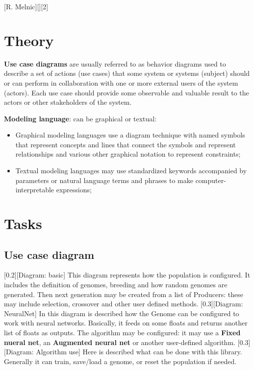 \documentclass{article}
\begin{document}
	[R. Melnic][][2]

	\section{Theory}
		\par \textbf{Use case diagrams} are usually referred to as behavior diagrams used to describe a set of actions (use cases) that some system or systems (subject) should or can perform in collaboration with one or more external users of the system (actors). Each use case should provide some observable and valuable result to the actors or other stakeholders of the system.

		\bigskip
		\textbf{Modeling language}: can be graphical or textual:
		\begin{itemize}
			\item Graphical modeling languages use a diagram technique with named symbols that represent concepts and lines that connect the symbols and represent relationships and various other graphical notation to represent constraints;
			\item Textual modeling languages may use standardized keywords accompanied by parameters or natural language terms and phrases to make computer-interpretable expressions;
		\end{itemize}

	\newpage
	\section{Tasks}
		\subsection{Use case diagram}
			[0.2][Diagram: basic]
			This diagram represents how the population is configured. It includes the definition of genomes, breeding and how random genomes are generated. Then next generation may be created from a list of Producers: these may include selection, crossover and other user defined methods.
			[0.3][Diagram: NeuralNet]
			In this diagram is described how the Genome can be configured to work with neural networks. Basically, it feeds on some floats and returns another list of floats as outputs. The algorithm may be configured: it may use a \textbf{Fixed nueral net}, an \textbf{Augmented neural net} or another user-defined algorithm.
			[0.3][Diagram: Algorithm use]
			Here is described what can be done with this library. Generally it can train, save/load a genome, or reset the population if needed.
\end{document}
